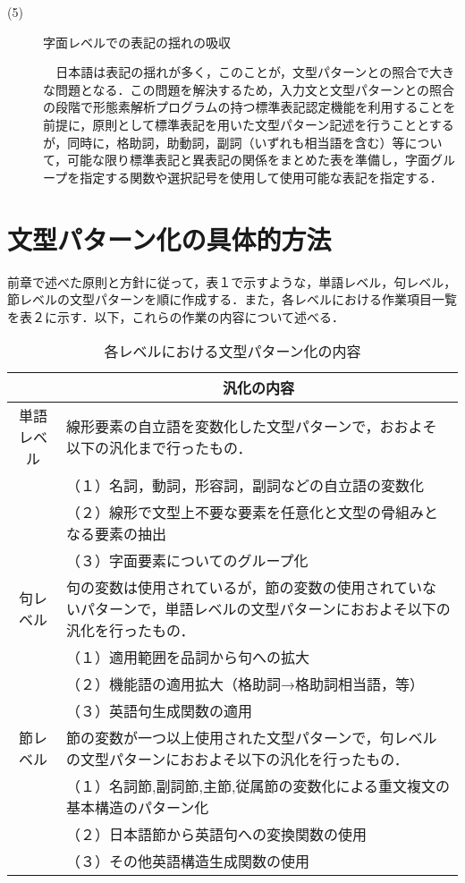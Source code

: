 \documentclass{nlp}
\begin{document}
\begin{description}
\item[(5)]字面レベルでの表記の揺れの吸収 

\verb|  |日本語は表記の揺れが多く，このことが，文型パターンとの照合で大きな問題となる．この問題を解決するため，入力文と文型パターンとの照合の段階で形態素解析プログラムの持つ標準表記認定機能を利用することを前提に，原則として標準表記を用いた文型パターン記述を行うこととするが，同時に，格助詞，助動詞，副詞（いずれも相当語を含む）等について，可能な限り標準表記と異表記の関係をまとめた表を準備し，字面グループを指定する関数や選択記号を使用して使用可能な表記を指定する．
\end{description}


\section{文型パターン化の具体的方法}

前章で述べた原則と方針に従って，表１で示すような，単語レベル，句レベル，節レベルの文型パターンを順に作成する．また，各レベルにおける作業項目一覧を表２に示す．以下，これらの作業の内容について述べる．

\begin{table}[htbp]
\small
\begin{center}
\caption{各レベルにおける文型パターン化の内容}
\begin{tabular}{|c|p{12cm}|}
\hline
 & \multicolumn{1}{|c|}{汎化の内容} \\ \hline
単語レベル & 線形要素の自立語を変数化した文型パターンで，おおよそ以下の汎化まで行ったもの．\\
 & （１）名詞，動詞，形容詞，副詞などの自立語の変数化 \\
 & （２）線形で文型上不要な要素を任意化と文型の骨組みとなる要素の抽出 \\
 & （３）字面要素についてのグループ化  \\ \hline
句レベル & 句の変数は使用されているが，節の変数の使用されていないパターンで，単語レベルの文型パターンにおおよそ以下の汎化を行ったもの． \\
 & （１）適用範囲を品詞から句への拡大 \\
 & （２）機能語の適用拡大（格助詞→格助詞相当語，等）\\
 & （３）英語句生成関数の適用 \\ \hline
節レベル & 節の変数が一つ以上使用された文型パターンで，句レベルの文型パターンにおおよそ以下の汎化を行ったもの． \\
 & （１）名詞節,副詞節,主節,従属節の変数化による重文複文の基本構造のパターン化 \\
 & （２）日本語節から英語句への変換関数の使用 \\
 & （３）その他英語構造生成関数の使用 \\ \hline
\end{tabular}
\end{center}
\end{table} 
\end{document}
